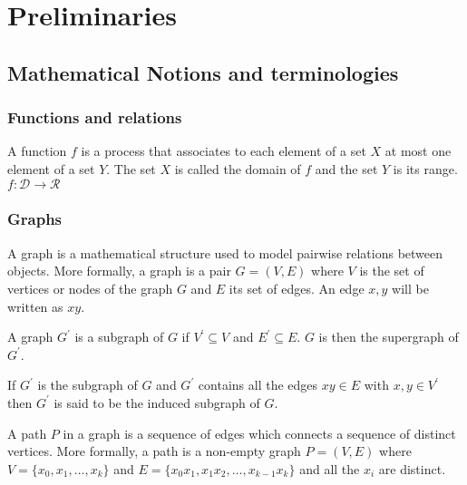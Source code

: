 \section{Preliminaries}
\label{sec:preliminaries}
\subsection{Mathematical Notions and terminologies}

\subsubsection{Functions and relations}
\begin{defn}
A function $f$ is a process that associates to each element of a set $X$ at most one element of a set $Y$. The set $X$ is called the domain of $f$ and the set $Y$ is its range.
$f : \mathcal{D} \rightarrow  \mathcal{R}$
\end{defn}

\subsubsection{Graphs}\cite{diestel_graph_2000}
\begin{defn}
A graph is a mathematical structure used to model pairwise relations between objects. More formally, a graph is a pair $G = (V, E)$ where $V$ is the set of vertices or nodes of the graph $G$ and $E$ its set of edges. An edge ${x,y}$ will be written as $xy$.
\end{defn}

\begin{defn}
A graph $G^{'}$ is a subgraph of $G$ if $V^{'} \subseteq V$ and $E^{'} \subseteq E$. $G$ is then the supergraph of $G^{'}$.
\end{defn}

\begin{defn}
If $G^{'}$ is the subgraph of $G$ and $G^{'}$ contains all the edges $xy \in E$ with $x,y \in V^{'}$ then $G^{'}$ is said to be the induced subgraph of $G$.  
\end{defn}

\begin{defn}
A path $P$ in a graph is a sequence of edges which connects a sequence of distinct vertices. More formally, a path is a non-empty graph $P = (V,E)$ where $V = \{x_0 ,x_1, \dots, x_k\}$ and $E = 
\{x_0x_1,x_1x_2, \dots , x_{k-1}x_k\}$ and all the $x_i$ are distinct.
\end{defn}

